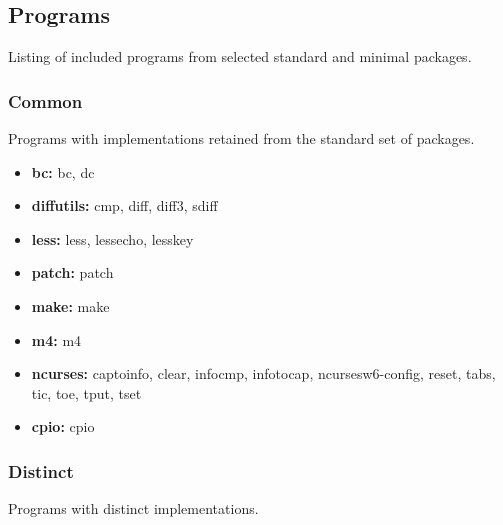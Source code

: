 \subsection{Programs}\label{Programs}

Listing of included programs from selected standard and minimal packages.

\subsubsection{Common}

Programs with implementations retained from the standard set of packages.

\begin{itemize}
    \item \textbf{bc:} bc, dc
    \item \textbf{diffutils:} cmp, diff, diff3, sdiff
    \item \textbf{less:} less, lessecho, lesskey
    \item \textbf{patch:} patch
    \item \textbf{make:} make
    \item \textbf{m4:} m4
    \item \textbf{ncurses:} captoinfo, clear, infocmp, infotocap, ncursesw6-config, reset, tabs, tic, toe, tput, tset
    \item \textbf{cpio:} cpio
\end{itemize}


\subsubsection{Distinct}

Programs with distinct implementations.

